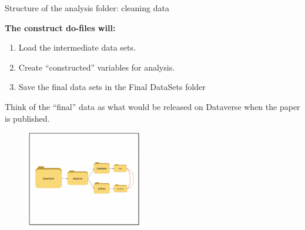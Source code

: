 \documentclass[aspectratio=169]{beamer}
\begin{document}
\begin{frame}[fragile]{Structure of the analysis folder: cleaning data}
\begin{multicols}{2}	
	
	\textbf{The construct do-files will:}
	
	\begin{enumerate}
		\item<1> Load the intermediate data sets.
		\item<1> Create “constructed” variables for analysis. 
		\item<1> Save the final data sets in the Final DataSets folder
	\end{enumerate}
	
	Think of the “final” data as what would be released on Dataverse when the paper is published.
	
	\begin{figure}
		\centering
		\includegraphics[width=50mm]{img/Structure9}
	\end{figure}
	
\end{multicols}
\end{frame}
\end{document}
